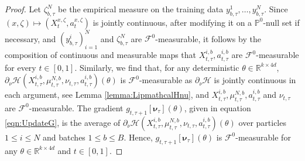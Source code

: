 \documentclass{article}
\newcommand{\R}{\mathbb{R}}
\begin{document}
\begin{appendices}
\begin{proof}
Let $\zeta^N_{b,\tau}$ be the empirical measure on the training data $y_{b,\tau}^1,\ldots,y_{b,\tau}^N$. Since $(x,\zeta)\mapsto (X_t^{x,\zeta}, a^{x,\zeta}_t)$ is jointly continuous, after modifying it on a $\mathbb P^0$-null set if necessary, and $(y^i_{b,\tau})_{i=1}^N$ and $ \zeta^N_{b,\tau}$ are $\mathcal F^0$-measurable, it follows by the composition of continuous and measurable maps that $X^{i,b}_{t,\tau},a^{i,b}_{t,\tau}$ are $\mathcal F^0$-measurable for every $t\in[0,1]$.
Similarly, we find that, for any deterministic $\theta\in \R^{k\times 4d}$, $\partial_\nu\mathcal H(X^{i,b}_{t,\tau},\mu^{N,b}_{t,\tau},\nu_{t,\tau},a^{i,b}_{t,\tau})(\theta)$ is $\mathcal F^0$-measurable as $\partial_\nu\mathcal H$ is jointly continuous in each argument, see Lemma \ref{lemma:LipmathcalHnu}, and $X^{i,b}_{t,\tau},\mu^{N,b}_{t,\tau},a^{i,b}_{t,\tau}$ and $\nu_{t,\tau}$ are $\mathcal F^0$-measurable. The gradient $g_{t,\tau+1}[\bm\nu_\tau](\theta)$, given in equation \eqref{eqn:UpdateG}, is the average of $\partial_\nu\mathcal H(X^{i,b}_{t,\tau},\mu^{N,b}_{t,\tau},\nu_{t,\tau},a^{i,b}_{t,\tau})(\theta)$ over particles $1\le i\le N$ and batches $1\le b\le B$. Hence, $g_{t,\tau+1}[\bm\nu_\tau](\theta)$ is $\mathcal F^0$-measurable for any $\theta\in \R^{k\times 4d}$ and $t\in[0,1]$.


\end{proof}
\end{appendices}
\end{document}
